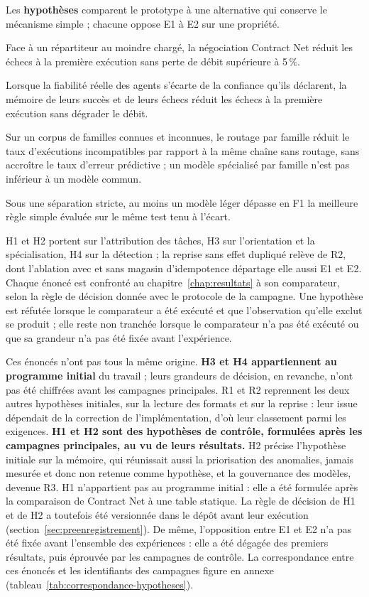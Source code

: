Les \textbf{hypothèses} comparent le prototype à une alternative qui conserve le mécanisme simple ; chacune oppose E1 à E2 sur une propriété.
\begin{description}[leftmargin=1.6cm, style=nextline]
    \item[\textbf{H1.}] Face à un répartiteur au moindre chargé, la négociation Contract Net réduit les échecs à la première exécution sans perte de débit supérieure à 5\,\%.
    \item[\textbf{H2.}] Lorsque la fiabilité réelle des agents s'écarte de la confiance qu'ils déclarent, la mémoire de leurs succès et de leurs échecs réduit les échecs à la première exécution sans dégrader le débit.
    \item[\textbf{H3.}] Sur un corpus de familles connues et inconnues, le routage par famille réduit le taux d'exécutions incompatibles par rapport à la même chaîne sans routage, sans accroître le taux d'erreur prédictive ; un modèle spécialisé par famille n'est pas inférieur à un modèle commun.
    \item[\textbf{H4.}] Sous une séparation stricte, au moins un modèle léger dépasse en F1 la meilleure règle simple évaluée sur le même test tenu à l'écart.
\end{description}

H1 et H2 portent sur l'attribution des tâches, H3 sur l'orientation et la spécialisation, H4 sur la détection ; la reprise sans effet dupliqué relève de R2, dont l'ablation avec et sans magasin d'idempotence départage elle aussi E1 et E2. Chaque énoncé est confronté au chapitre~\ref{chap:resultats} à son comparateur, selon la règle de décision donnée avec le protocole de la campagne. Une hypothèse est réfutée lorsque le comparateur a été exécuté et que l'observation qu'elle exclut se produit ; elle reste non tranchée lorsque le comparateur n'a pas été exécuté ou que sa grandeur n'a pas été fixée avant l'expérience.

Ces énoncés n'ont pas tous la même origine. \textbf{H3 et H4 appartiennent au programme initial} du travail ; leurs grandeurs de décision, en revanche, n'ont pas été chiffrées avant les campagnes principales. R1 et R2 reprennent les deux autres hypothèses initiales, sur la lecture des formats et sur la reprise : leur issue dépendait de la correction de l'implémentation, d'où leur classement parmi les exigences. \textbf{H1 et H2 sont des hypothèses de contrôle, formulées après les campagnes principales, au vu de leurs résultats.} H2 précise l'hypothèse initiale sur la mémoire, qui réunissait aussi la priorisation des anomalies, jamais mesurée et donc non retenue comme hypothèse, et la gouvernance des modèles, devenue R3. H1 n'appartient pas au programme initial : elle a été formulée après la comparaison de Contract Net à une table statique. La règle de décision de H1 et de H2 a toutefois été versionnée dans le dépôt avant leur exécution (section~\ref{sec:preenregistrement}). De même, l'opposition entre E1 et E2 n'a pas été fixée avant l'ensemble des expériences : elle a été dégagée des premiers résultats, puis éprouvée par les campagnes de contrôle. La correspondance entre ces énoncés et les identifiants des campagnes figure en annexe (tableau~\ref{tab:correspondance-hypotheses}).


